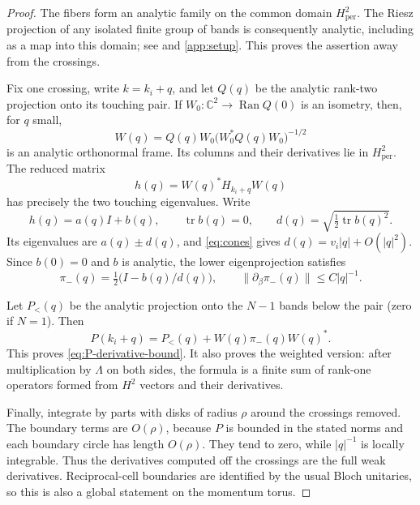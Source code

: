 \documentclass[11pt,a4paper]{article}
\newcommand{\C}{\mathbb C}
\newcommand{\per}{\mathrm{per}}
\DeclareMathOperator{\tr}{tr}
\DeclareMathOperator{\Ran}{Ran}
\theoremstyle{remark}
\numberwithin{equation}{section}
\begin{document}
\begin{proof}
The fibers form an analytic family on the common domain $H^2_{\per}$.
The Riesz projection of any isolated finite group of bands is consequently
analytic, including as a map into this domain; see
\cite[\S XII.2]{RS4} and \cref{app:setup}.
This proves the assertion away from the crossings.

Fix one crossing, write $k=k_i+q$, and let $Q(q)$ be the analytic
rank-two projection onto its touching pair. If $W_0:\C^2\to\Ran Q(0)$
is an isometry, then, for $q$ small,
\begin{equation}\label{eq:frame}
 W(q)=Q(q)W_0\bigl(W_0^*Q(q)W_0\bigr)^{-1/2}
\end{equation}
is an analytic orthonormal frame. Its columns and their derivatives lie
in $H^2_{\per}$. The reduced matrix
\begin{equation}\label{eq:h}
 h(q)=W(q)^*H_{k_i+q}W(q)
\end{equation}
has precisely the two touching eigenvalues. Write
\[
 h(q)=a(q)I+b(q),\qquad \tr b(q)=0,\qquad
 d(q)=\sqrt{\tfrac12\tr b(q)^2}.
\]
Its eigenvalues are $a(q)\pm d(q)$, and \eqref{eq:cones} gives
$d(q)=v_i|q|+O(|q|^2)$. Since $b(0)=0$ and $b$ is analytic,
the lower eigenprojection satisfies
\begin{equation}\label{eq:lower-projection}
 \pi_-(q)=\tfrac12\bigl(I-b(q)/d(q)\bigr),\qquad
 \|\partial_\beta\pi_-(q)\|\le C|q|^{-1}.
\end{equation}

Let $P_<(q)$ be the analytic projection onto the $N-1$ bands below
the pair (zero if $N=1$). Then
\begin{equation}\label{eq:P-local}
 P(k_i+q)=P_<(q)+W(q)\pi_-(q)W(q)^*.
\end{equation}
This proves \eqref{eq:P-derivative-bound}. It also proves the weighted
version: after multiplication by $\Lambda$ on both sides, the formula
is a finite sum of rank-one operators formed from $H^2$ vectors and
their derivatives.

Finally, integrate by parts with disks of radius $\rho$ around the
crossings removed. The boundary terms are $O(\rho)$, because $P$ is
bounded in the stated norms and each boundary circle has length
$O(\rho)$. They tend to zero, while $|q|^{-1}$ is locally integrable.
Thus the derivatives computed off the crossings are the full weak
derivatives. Reciprocal-cell boundaries are identified by the usual
Bloch unitaries, so this is also a global statement on the momentum
torus.
\end{proof}
\end{document}
